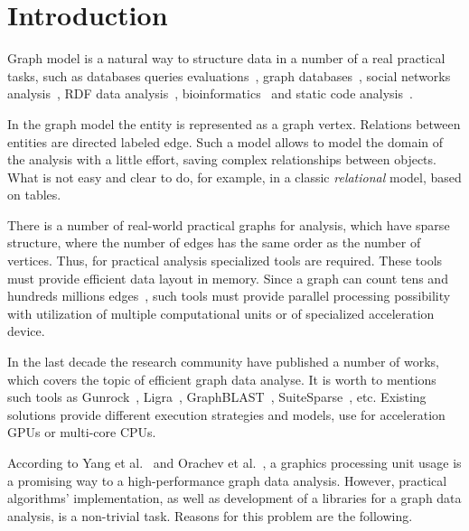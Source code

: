 \section*{Introduction}

Graph model is a natural way to structure data in a number of a real practical tasks, such as databases queries evaluations~\cite{article:querying_graph_databases}, graph databases~\cite{paper:redisgraph}, social networks analysis~\cite{article:facebook_large_scale}, RDF data analysis~\cite{article:cfpq_and_rdf_analysis}, bioinformatics~\cite{article:rna_prediction} and static code analysis~\cite{article:dyck_cfl_code_analysis}. 

In the graph model the entity is represented as a graph vertex. Relations between entities are directed labeled edge. Such a model allows to model the domain of the analysis with a little effort, saving complex relationships between objects. What is not easy and clear to do, for example, in a classic \textit{relational} model, based on tables.

There is a number of real-world practical graphs for analysis, which have sparse structure, where the number of edges has the same order as the number of vertices. Thus, for practical analysis specialized tools are required. These tools must provide efficient data layout in memory. Since a graph can count tens and hundreds millions edges~\cite{article:facebook_large_scale}, such tools must provide parallel processing possibility with utilization of multiple computational units or of specialized acceleration device.

In the last decade the research community have published a number of works, which covers the topic of efficient graph data analyse. It is worth to mentions such tools as Gunrock~\cite{article:gunrock}, Ligra~\cite{article:ligra}, GraphBLAST~\cite{yang2019graphblast}, SuiteSparse~\cite{article:suite_sparse_for_graph_problems}, etc. Existing solutions provide different execution strategies and models, use for acceleration GPUs or multi-core CPUs.

According to Yang et al.~\cite{yang2019graphblast} and Orachev et al.~\cite{net:cubool_project}, a graphics processing unit usage is a promising way to a high-performance graph data analysis. However, practical algorithms' implementation, as well as development of a libraries for a graph data analysis, is a non-trivial task. Reasons for this problem are the following.

